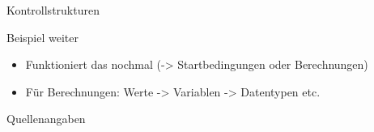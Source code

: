 \documentclass[aspectratio=169,t]{beamer}
\begin{document}
\begin{frame}{Kontrollstrukturen}
\end{frame}

\begin{frame}{Beispiel weiter}
	\begin{itemize}
		\item Funktioniert das nochmal (-> Startbedingungen oder Berechnungen)
		\item Für Berechnungen: Werte -> Variablen -> Datentypen etc.
	\end{itemize}
\end{frame}

\begin{frame}[allowframebreaks]{Quellenangaben}
    \printbibliography
\end{frame}


\end{document}
